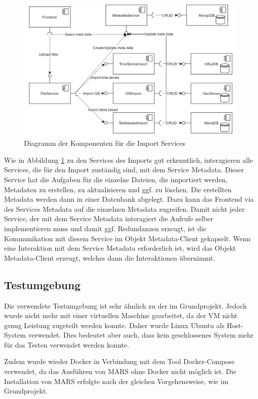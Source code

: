 \documentclass{llncs}
\begin{document}
\begin{figure}[htbp]
  \centering
      \includegraphics[width=1\textwidth]{./Images/ImportServices}
    \caption{Diagramm der Komponenten für die Import Services}
    \label{fig:ImportServices}
\end{figure}

Wie in Abbildung \ref{fig:ImportServices} zu den Services des Imports gut erkenntlich, interagieren alle Services, die für den Import zuständig sind, mit dem Service Metadata. Dieser Service hat die Aufgaben für die einzelne Dateien, die importiert werden, Metadaten zu erstellen, zu aktualisieren und ggf. zu löschen. Die erstellten Metadata werden dann in einer Datenbank abgelegt. Dazu kann das Frontend via des Services Metadata auf die einzelnen Metadata zugreifen. Damit nicht jeder Service, der mit dem Service Metadata interagiert die Aufrufe selber implementieren muss und damit ggf. Redundanzen erzeugt, ist die Kommunikation mit diesem Service im Objekt Metadata-Client gekapselt. Wenn eine Interaktion mit dem Service Metadata erforderlich ist, wird das Objekt Metadata-Client erzeugt, welches dann die Interaktionen übernimmt.

\subsection{Testumgebung}
Die verwendete Testumgebung ist sehr ähnlich zu der im Grundprojekt. Jedoch wurde nicht mehr mit einer virtuellen Maschine gearbeitet, da der VM nicht genug Leistung zugeteilt werden konnte. Daher wurde Linux Ubuntu als Host-System verwendet. Dies bedeutet aber auch, dass kein geschlossenes System mehr für das Testen verwendet werden konnte. 

Zudem wurde wieder Docker in Verbindung mit dem Tool Docker-Compose verwendet, da das Ausführen von MARS ohne Docker nicht möglich ist. Die Installation von MARS erfolgte nach der gleichen Vorgehensweise, wie im Grundprojekt. 
\end{document}
